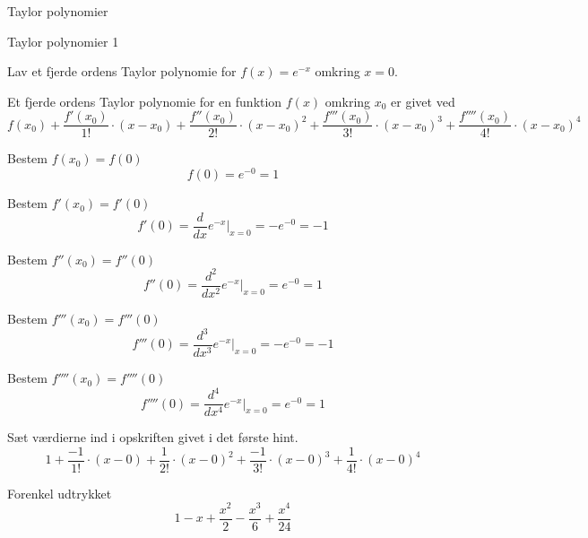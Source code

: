 \documentclass{article}
\begin{document}
Taylor polynomier
\tableofcontents
\newpage

\begin{exercise}{Taylor polynomier 1}

Lav et fjerde ordens Taylor polynomie for $f(x) = e^{-x}$
omkring $x = 0$.


\hint
Et fjerde ordens Taylor polynomie for en funktion $f(x)$
omkring $x_0$ er givet ved
\[
f(x_0) + \frac{f'(x_0)}{1!} \cdot (x - x_0) + \frac{f''(x_0)}{2!} \cdot (x - x_0)^2 + \frac{f'''(x_0)}{3!} \cdot (x - x_0)^3 + \frac{f''''(x_0)}{4!} \cdot (x - x_0)^4
\]

\hint
Bestem $f(x_0) = f(0)$
\[
f(0) = e^{-0} = 1
\]

\hint
Bestem $f'(x_0) = f'(0)$
\[
f'(0) = \frac{d}{dx} e^{-x} \Big|_{x = 0} = -e^{-0} = -1
\]

\hint
Bestem $f''(x_0) = f''(0)$
\[
f''(0) = \frac{d^2}{dx^2} e^{-x} \Big|_{x = 0} = e^{-0} = 1
\]

\hint
Bestem $f'''(x_0) = f'''(0)$
\[
f'''(0) = \frac{d^3}{dx^3} e^{-x} \Big|_{x = 0} = -e^{-0} = -1
\]

\hint
Bestem $f''''(x_0) = f''''(0)$
\[
f''''(0) = \frac{d^4}{dx^4} e^{-x} \Big|_{x = 0} = e^{-0} = 1
\]

\hint
Sæt værdierne ind i opskriften givet i det første hint.
\[
1 + \frac{-1}{1!} \cdot (x - 0) + \frac{1}{2!} \cdot (x - 0)^2 + \frac{-1}{3!} \cdot (x - 0)^3 + \frac{1}{4!} \cdot (x - 0)^4
\]

\hint
Forenkel udtrykket
\[
1 - x + \frac{x^2}{2} - \frac{x^3}{6} + \frac{x^4}{24}
\]

\end{exercise}
\end{document}
